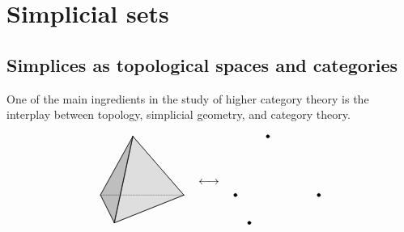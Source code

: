 \documentclass[main.tex]{subfiles}
\begin{document}
\chapter{Simplicial sets}
\label{ch:simplicial_sets}

\section{Simplices as topological spaces and categories}
\label{sec:simplices_as_topological_spaces_and_categories}

One of the main ingredients in the study of higher category theory is the interplay between topology, simplicial geometry, and category theory.

\begin{equation*}
  \begin{aligned}
    \begin{tikzpicture}[line join = round, scale=1.5, line cap = round]
      \coordinate (3) at (0,{sqrt(2)},0);
      \coordinate (2) at ({-.5*sqrt(3)},0,-.5);
      \coordinate (1) at (0,0,1);
      \coordinate (0) at ({.5*sqrt(3)},0,-.5);

      \draw[densely dotted,] (0)--(2);
      \draw[fill=lightgray,fill opacity=.5] (1)--(0)--(3)--cycle;
      \draw[fill=gray,fill opacity=.5] (2)--(1)--(3)--cycle;
      \draw (1)--(0);
      \draw (1)--(2);
      \draw (2)--(3);
      \draw (1)--(3);
      \draw (0)--(3);
    \end{tikzpicture}
  \end{aligned}
  \quad \longleftrightarrow \quad
  \begin{aligned}
    \begin{tikzpicture}[dot/.style={draw,circle,minimum size=1mm,inner sep=0pt,outer sep=0pt,fill=black}, line join = round, scale=1.5, line cap = round]

      \coordinate[draw, dot] (3) at (0,{sqrt(2)},0);
      \coordinate[draw, dot] (2) at ({.5*sqrt(3)},0,-.5);
      \coordinate[draw, dot] (1) at (0,0,1);
      \coordinate[draw, dot] (0) at ({-.5*sqrt(3)},0,-.5);


\end{tikzpicture}
\end{aligned}
\end{equation*}
\end{document}
